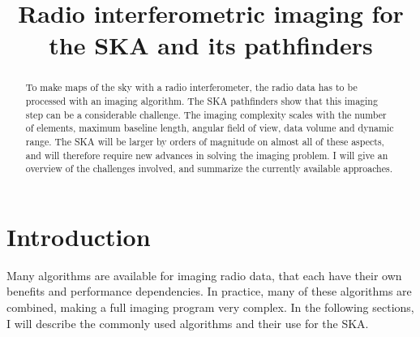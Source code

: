 \documentclass[9pt,conference,a4paper]{IEEEtran}
\begin{document}
\title{Radio interferometric imaging for the SKA and its pathfinders}

\author{%
%
%
} %

\maketitle


\begin{abstract}
To make maps of the sky with a radio interferometer, the radio data has to be processed with an imaging algorithm. The SKA pathfinders show that this imaging step can be a considerable challenge. The imaging complexity scales with the number of elements, maximum baseline length, angular field of view, data volume and dynamic range. The SKA will be larger by orders of magnitude on almost all of these aspects, and will therefore require new advances in solving the imaging problem. I will give an overview of the challenges involved, and summarize the currently available approaches.\end{abstract}

\section{Introduction}
Many algorithms are available for imaging radio data, that each have their own benefits and performance dependencies. In practice, many of these algorithms are combined, making a full imaging program very complex. In the following sections, I will describe the commonly used algorithms and their use for the SKA.
\end{document}
